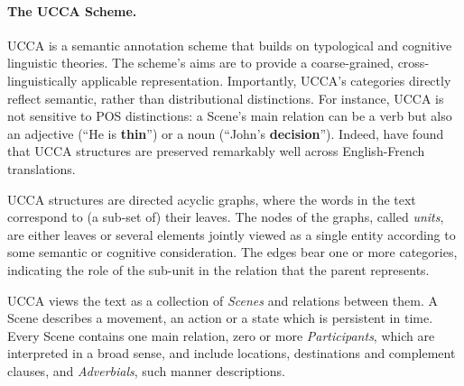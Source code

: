 \documentclass[a4paper, 11pt]{article}
\newcommand{\com}[1]{}
\begin{document}
\paragraph{The UCCA Scheme.}\label{sec:ucca}
UCCA is a semantic annotation scheme that builds on
typological and cognitive linguistic theories.
The scheme's aims are to provide a coarse-grained, cross-linguistically
applicable representation.
Importantly, UCCA's categories directly reflect semantic, rather than
distributional distinctions.
For instance, UCCA is not sensitive to POS distinctions:
a Scene's main relation can be a verb but also an adjective
(``He is {\bf thin}'') or a noun (``John's {\bf decision}'').
Indeed,  have found that UCCA structures are
preserved remarkably well across English-French translations. 

UCCA structures are directed acyclic graphs, where the words in the text 
correspond to (a sub-set of) their leaves.
The nodes of the graphs, called {\it units}, are either leaves or several elements jointly
viewed as a single entity according to some semantic or cognitive consideration.
The edges bear one or more categories, indicating the role of 
the sub-unit in the relation that the parent represents.

UCCA views the text as a collection of {\it Scenes} and relations between them.
A Scene describes a movement, 
an action or a state which is persistent in time.
Every Scene contains one main relation, 
zero or more {\it Participants}, 
which are interpreted in a broad sense, 
and include locations, destinations and complement clauses,
and {\it Adverbials}, such manner descriptions.
\com{
\begin{figure}[t]
				\begin{tikzpicture}[sibling distance=10mm, level distance=10mm, ->,
				every node/.append style={midway},
				every circle node/.append style={fill=black}]
				{
					\node (Source) [circle] {}
					child {node (He) {He} edge from parent node[left] {\scriptsize A}
					}
					child {node (gave) {gve} edge from parent node[right] {\scriptsize A}}
					child {node (an apple) [circle] {}
						{
							child {node (an) {an} edge from parent node[left] {\scriptsize E}}
							child {node (apple){apple} edge from parent node[right] {\scriptsize C}}
						} edge from parent node[right] {\scriptsize P} }
					;}
					\end{tikzpicture}
		\end{figure}}
\end{document}
